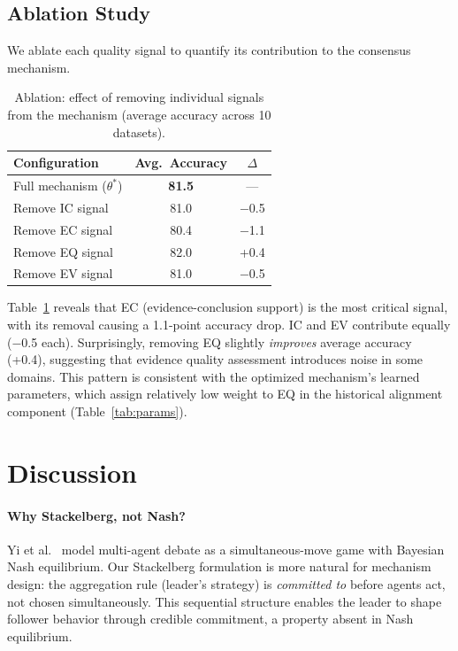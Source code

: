 \documentclass[runningheads]{llncs}
\begin{document}
\subsection{Ablation Study}

We ablate each quality signal to quantify its contribution to the consensus mechanism.

\begin{table}[t]
\caption{Ablation: effect of removing individual signals from the mechanism (average accuracy across 10 datasets).}\label{tab:ablation}
\centering
\begin{tabular}{@{}lcc@{}}
\toprule
Configuration & Avg.\ Accuracy & $\Delta$ \\
\midrule
Full mechanism ($\theta^*$) & \textbf{81.5} & --- \\
Remove IC signal & 81.0 & $-$0.5 \\
Remove EC signal & 80.4 & $-$1.1 \\
Remove EQ signal & 82.0 & +0.4 \\
Remove EV signal & 81.0 & $-$0.5 \\
\bottomrule
\end{tabular}
\end{table}

Table~\ref{tab:ablation} reveals that EC (evidence-conclusion support) is the most critical signal, with its removal causing a 1.1-point accuracy drop. IC and EV contribute equally ($-$0.5 each). Surprisingly, removing EQ slightly \emph{improves} average accuracy (+0.4), suggesting that evidence quality assessment introduces noise in some domains. This pattern is consistent with the optimized mechanism's learned parameters, which assign relatively low weight to EQ in the historical alignment component (Table~\ref{tab:params}).

\section{Discussion}
\label{sec:discussion}

\paragraph{Why Stackelberg, not Nash?}
Yi et al.~\cite{yi2025debate} model multi-agent debate as a simultaneous-move game with Bayesian Nash equilibrium. Our Stackelberg formulation is more natural for mechanism design: the aggregation rule (leader's strategy) is \emph{committed to} before agents act, not chosen simultaneously. This sequential structure enables the leader to shape follower behavior through credible commitment, a property absent in Nash equilibrium.
\end{document}
